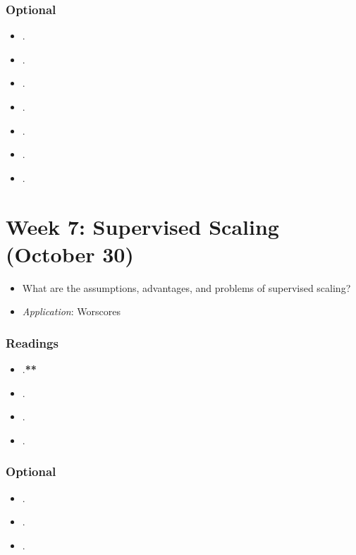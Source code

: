 \documentclass[abstract=on,parskip=full,headings=standardclasses,fontsize=11pt,paper=a4]{scrartcl}
\begin{document}
\subsubsection*{Optional}
\begin{itemize}
\item {}.
\item {}.
\item {}.
\item {}.
\item {}.
\item {}.
\item {}.
\end{itemize}

 
\section{Week 7:  Supervised Scaling (October 30)}

\begin{itemize}
\renewcommand\labelitemi{--}
\item What are the assumptions, advantages, and problems of supervised scaling?
\item \textit{Application}: Worscores
\end{itemize}

\subsubsection*{Readings}
\begin{itemize}
\item {}.\textbf{**}
\item {}.
\item {}.
\item {}.
\end{itemize}

\subsubsection*{Optional}
\begin{itemize}
\item {}.
\item {}.
\item {}.
\end{itemize}
\end{document}
